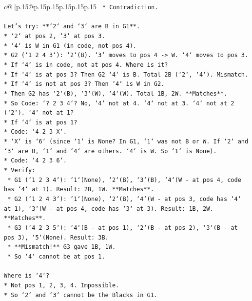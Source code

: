 \documentclass{article}
\begin{document}
{\begin{supertabular}{c@{$\;$}|p{.15\linewidth}@{}p{.15\linewidth}p{.15\linewidth}p{.15\linewidth}p{.15\linewidth}p{.15\linewidth}}
{{{\texttt{        *   Contradiction.} \\
\\ 
\texttt{Let's try: **`2` and `3` are B in G1**.} \\
\texttt{*   `2` at pos 2, `3` at pos 3.} \\
\texttt{*   `4` is W in G1 (in code, not pos 4).} \\
\texttt{*   G2 (`1 2 4 3`): `2`(B). `3` moves to pos 4 {-}> W. `4` moves to pos 3.} \\
\texttt{*   If `4` is in code, not at pos 4. Where is it?} \\
\texttt{*   If `4` is at pos 3? Then G2 `4` is B. Total 2B (`2`, `4`). Mismatch.} \\
\texttt{*   If `4` is not at pos 3? Then `4` is W in G2.} \\
\texttt{*   Then G2 has `2`(B), `3`(W), `4`(W). Total 1B, 2W. **Matches**.} \\
\texttt{*   So Code: `? 2 3 4`? No, `4` not at 4. `4` not at 3. `4` not at 2 (`2`). `4` not at 1?} \\
\texttt{*   If `4` is at pos 1?} \\
\texttt{*   Code: `4 2 3 X`.} \\
\texttt{*   `X` is `6` (since `1` is None? In G1, `1` was not B or W. If `2` and `3` are B, `1` and `4` are others. `4` is W. So `1` is None).} \\
\texttt{*   Code: `4 2 3 6`.} \\
\texttt{*   Verify:} \\
\texttt{    *   G1 (`1 2 3 4`): `1`(None), `2`(B), `3`(B), `4`(W {-} at pos 4, code has `4` at 1). Result: 2B, 1W. **Matches**.} \\
\texttt{    *   G2 (`1 2 4 3`): `1`(None), `2`(B), `4`(W {-} at pos 3, code has `4` at 1), `3`(W {-} at pos 4, code has `3` at 3). Result: 1B, 2W. **Matches**.} \\
\texttt{    *   G3 (`4 2 3 5`): `4`(B {-} at pos 1), `2`(B {-} at pos 2), `3`(B {-} at pos 3), `5`(None). Result: 3B.} \\
\texttt{    *   **Mismatch!** G3 gave 1B, 1W.} \\
\texttt{    *   So `4` cannot be at pos 1.} \\
\\ 
\texttt{Where is `4`?} \\
\texttt{*   Not pos 1, 2, 3, 4. Impossible.} \\
\texttt{*   So `2` and `3` cannot be the Blacks in G1.} \\
\\ 
}}}
\end{supertabular}}
\end{document}
